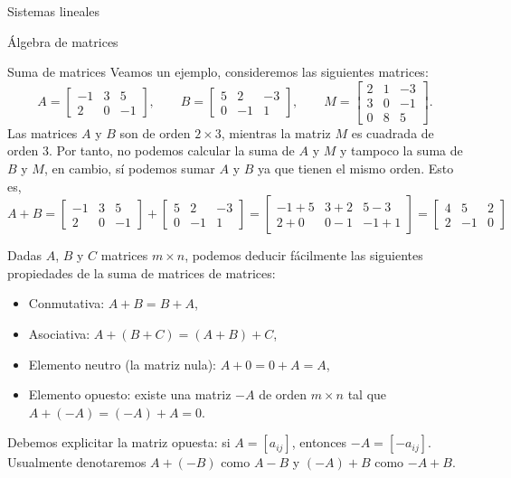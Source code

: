 \documentclass[a4paper,12pt,twoside,spanish,reqno]{amsbook}
\numberwithin{equation}{section}
\theoremstyle{definition}
\theoremstyle{remark}
\begin{document}
\begin{chapter}{Sistemas lineales}
\begin{section}{Álgebra de matrices}
\begin{subsection}{Suma  de matrices}
                Veamos un ejemplo, consideremos las siguientes matrices:
                \begin{equation*}
                A = \begin{bmatrix} -1&3&5 \\ 2&0&-1  \end{bmatrix}, \qquad
                B = \begin{bmatrix} 5&2&-3 \\ 0&-1&1  \end{bmatrix}, \qquad
                M = \begin{bmatrix} 2&1&-3 \\ 3&0&-1 \\ 0&8&5 \end{bmatrix}.
                \end{equation*}
                Las matrices $A$ y $B$ son de orden $2 \times 3$, mientras la matriz $M$ es cuadrada de orden 3. Por tanto, no podemos calcular la suma de $A$ y $M$ y tampoco la suma de $B$ y $M$, en cambio, sí podemos sumar $A$ y $B$ ya que tienen el mismo orden. Esto es,
                \begin{equation*}
                A + B = \begin{bmatrix} -1&3&5 \\ 2&0&-1  \end{bmatrix}+
                \begin{bmatrix} 5&2&-3 \\ 0&-1&1  \end{bmatrix} =
                \begin{bmatrix} -1+5&3+2&5-3 \\ 2+0&0-1&-1+1  \end{bmatrix}=
                \begin{bmatrix} 4&5&2 \\ 2&-1&0  \end{bmatrix}
                \end{equation*}
                
                
                Dadas $A$, $B$ y $C$ matrices $m \times n$, podemos deducir fácilmente las siguientes propiedades de la suma de matrices de matrices:
                \begin{itemize}
                    \item Conmutativa: $A + B = B + A$,
                    \item Asociativa: $A + (B + C) = (A + B) + C$,
                    \item Elemento neutro (la matriz nula): $A + 0 = 0 + A = A$,
                    \item Elemento opuesto: existe una matriz $-A$ de orden $m \times n$ tal que  $A + (-A) = (-A) + A = 0$.
                \end{itemize}
                Debemos explicitar la matriz opuesta: si $A = [a_{ij}]$,  entonces $-A = [-a_{ij}]$. Usualmente denotaremos $A + (-B)$ como $A-B$ y $(-A)+B$ como $-A+B$. 
                

\end{subsection}
\end{section}
\end{chapter}
\end{document}
